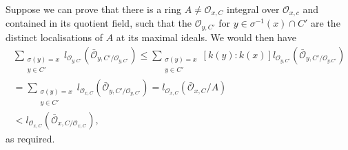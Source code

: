 Suppose we can prove that there is a ring $ A \neq \mathscr{O}_{x,C}$
integral over $\mathscr{O}_{x,c}$ and contained in its quotient field,
such that the $\mathscr{O}_{y,C'}$ for $ y \in \sigma^{-1}(x) \cap C'$
are the distinct localisations of $A$ at its maximal ideals. We would
then have 
\begin{gather*}
  \sum_{\substack {\sigma (y) = x \\ {y \in
        C'}}} l_{\mathscr{O}_{y,C'}}(\bar{\mathscr{O}}_{y,C'/\mathscr{O}_{y,C'}})
  \leq \sum_{ \substack {\sigma (y) = x \\{y \in C'}}}
       [k(y):k(x)]l_{\mathscr{O}_{y,C'}}(\bar{\mathscr{O}}_{y,C'/\mathscr{O}_{y.C'}})\\ 
       =\sum_{ \substack {\sigma (y)= x \\{y \in
             C'}}}l_{\mathscr{O}_{x,C}}(\bar{\mathscr{O}}_{y,C'/\mathscr{O}_{y,C'}})
       = l_{\mathscr{O}_{x,C}}(\bar{\mathscr{O}}_{x,C}/A)\\ 
       < l_{\mathscr{O}_{x,C}}(\bar{\mathscr{O}}_{x,C/\mathscr{O}_{x,C}}),
\end{gather*}
as required.

